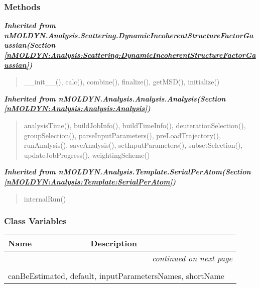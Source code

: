 
  \subsubsection{Methods}


\large{\textbf{\textit{Inherited from nMOLDYN.Analysis.Scattering.DynamicIncoherentStructureFactorGaussian\textit{(Section \ref{nMOLDYN:Analysis:Scattering:DynamicIncoherentStructureFactorGaussian})}}}}

\begin{quote}
\_\_init\_\_(), calc(), combine(), finalize(), getMSD(), initialize()
\end{quote}

\large{\textbf{\textit{Inherited from nMOLDYN.Analysis.Analysis.Analysis\textit{(Section \ref{nMOLDYN:Analysis:Analysis:Analysis})}}}}

\begin{quote}
analysisTime(), buildJobInfo(), buildTimeInfo(), deuterationSelection(), groupSelection(), parseInputParameters(), preLoadTrajectory(), runAnalysis(), saveAnalysis(), setInputParameters(), subsetSelection(), updateJobProgress(), weightingScheme()
\end{quote}

\large{\textbf{\textit{Inherited from nMOLDYN.Analysis.Template.SerialPerAtom\textit{(Section \ref{nMOLDYN:Analysis:Template:SerialPerAtom})}}}}

\begin{quote}
internalRun()
\end{quote}


  \subsubsection{Class Variables}

    \vspace{-1cm}
\hspace{\varindent}\begin{longtable}{|p{\varnamewidth}|p{\vardescrwidth}|l}
\cline{1-2}
\cline{1-2} \centering \textbf{Name} & \centering \textbf{Description}& \\
\cline{1-2}
\endhead\cline{1-2}\multicolumn{3}{r}{\small\textit{continued on next page}}\\\endfoot\cline{1-2}
\endlastfoot\multicolumn{2}{|l|}{\textit{Inherited from nMOLDYN.Analysis.Scattering.DynamicIncoherentStructureFactorGaussian \textit{(Section \ref{nMOLDYN:Analysis:Scattering:DynamicIncoherentStructureFactorGaussian})}}}\\
\multicolumn{2}{|p{\varwidth}|}{\raggedright canBeEstimated, default, inputParametersNames, shortName}\\
\cline{1-2}
\end{longtable}


